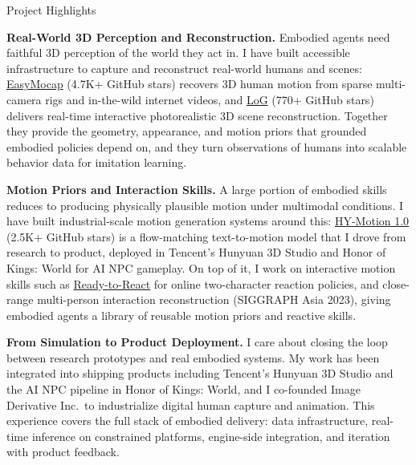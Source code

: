 \begin{rSection}{Project Highlights}

    {\bf Real-World 3D Perception and Reconstruction.} Embodied agents need faithful 3D perception of the world they act in. I have built accessible infrastructure to capture and reconstruct real-world humans and scenes: \href{https://github.com/zju3dv/EasyMocap}{EasyMocap} (4.7K+ GitHub stars) recovers 3D human motion from sparse multi-camera rigs and in-the-wild internet videos, and \href{https://github.com/zju3dv/LoG}{LoG} (770+ GitHub stars) delivers real-time interactive photorealistic 3D scene reconstruction. Together they provide the geometry, appearance, and motion priors that grounded embodied policies depend on, and they turn observations of humans into scalable behavior data for imitation learning.

    {\bf Motion Priors and Interaction Skills.} A large portion of embodied skills reduces to producing physically plausible motion under multimodal conditions. I have built industrial-scale motion generation systems around this: \href{https://github.com/Tencent-Hunyuan/HY-Motion-1.0}{HY-Motion 1.0} (2.5K+ GitHub stars) is a flow-matching text-to-motion model that I drove from research to product, deployed in Tencent's Hunyuan 3D Studio and Honor of Kings: World for AI NPC gameplay. On top of it, I work on interactive motion skills such as \href{https://zju3dv.github.io/ready_to_react/}{Ready-to-React} for online two-character reaction policies, and close-range multi-person interaction reconstruction (SIGGRAPH Asia 2023), giving embodied agents a library of reusable motion priors and reactive skills.

    {\bf From Simulation to Product Deployment.} I care about closing the loop between research prototypes and real embodied systems. My work has been integrated into shipping products including Tencent's Hunyuan 3D Studio and the AI NPC pipeline in Honor of Kings: World, and I co-founded Image Derivative Inc.\ to industrialize digital human capture and animation. This experience covers the full stack of embodied delivery: data infrastructure, real-time inference on constrained platforms, engine-side integration, and iteration with product feedback.

\end{rSection}
